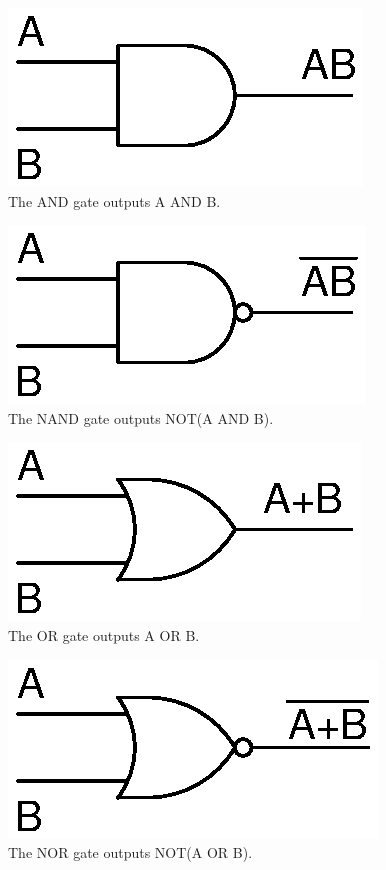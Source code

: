 \begin{figure}[!htb]
	\centering
	\includegraphics[scale=0.7]{logic/AND.eps}
	\caption{The AND gate outputs A AND B.}
	\label{fig:andgate}
\end{figure} 

\begin{figure}[!htb]
	\centering
	\includegraphics[scale=0.7]{logic/NAND.eps}
	\caption{The NAND gate outputs NOT(A AND B).}
	\label{fig:nandgate}
\end{figure} 

\begin{figure}[!htb]
	\centering
	\includegraphics[scale=0.7]{logic/OR.eps}
	\caption{The OR gate outputs A OR B.}
	\label{fig:orgate}
\end{figure} 

\begin{figure}[!htb]
	\centering
	\includegraphics[scale=0.7]{logic/NOR.eps}
	\caption{The NOR gate outputs NOT(A OR B).}
	\label{fig:norgate}
\end{figure} 

